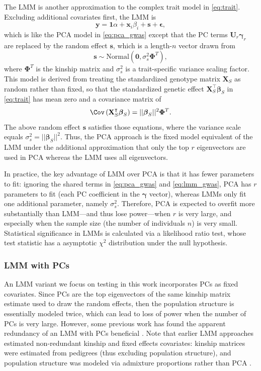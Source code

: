 \documentclass[11pt]{article}
\begin{document}
The LMM is another approximation to the complex trait model in \cref{eq:trait}.
Excluding additional covariates first, the LMM is
\begin{equation}
  \label{eq:lmm_gwas}
  \mathbf{y}
  =
  \mathbf{1} \alpha + \mathbf{x}_i \beta_i + \mathbf{s} + \boldsymbol{\epsilon}
  ,
\end{equation}
which is like the PCA model in \cref{eq:pca_gwas} except that the PC terms $\mathbf{U}_r \boldsymbol{\gamma}_r$ are replaced by the random effect $\mathbf{s}$, which is a length-$n$ vector drawn from \citep{sul_population_2018}
$$
\mathbf{s} \sim \text{Normal} \left( \mathbf{0}, \sigma^2_s \mathbf{\Phi}^T \right),
$$
where $\mathbf{\Phi}^T$ is the kinship matrix and $\sigma^2_s$ is a trait-specific variance scaling factor.
This model is derived from treating the standardized genotype matrix $\mathbf{X}_S$ as random rather than fixed, so that the standardized genetic effect
$\mathbf{X}_S^\intercal \boldsymbol{\beta}_S$
in \cref{eq:trait} has mean zero and a covariance matrix of
$$
\Cov \left( \mathbf{X}_S^\intercal \boldsymbol{\beta}_S \right)
=
|| \boldsymbol{\beta}_S ||^2 \mathbf{\Phi}^T
.
$$
The above random effect $\mathbf{s}$ satisfies those equations, where the variance scale equals $\sigma^2_s = || \boldsymbol{\beta}_S ||^2$.
Thus, the PCA approach is the fixed model equivalent of the LMM under the additional approximation that only the top $r$ eigenvectors are used in PCA whereas the LMM uses all eigenvectors.

In practice, the key advantage of LMM over PCA is that it has fewer parameters to fit: ignoring the shared terms in \cref{eq:pca_gwas} and \cref{eq:lmm_gwas}, PCA has $r$ parameters to fit (each PC coefficient in the $\boldsymbol{\gamma}$ vector), whereas LMMs only fit one additional parameter, namely $\sigma^2_s$.
Therefore, PCA is expected to overfit more substantially than LMM---and thus lose power---when $r$ is very large, and especially when the sample size (the number of individuals $n$) is very small.
Statistical significance in LMMs is calculated via a likelihood ratio test, whose test statistic has a asymptotic $\chi^2$ distribution under the null hypothesis.

\subsubsection{LMM with PCs}

An LMM variant we focus on testing in this work incorporates PCs as fixed covariates.
Since PCs are the top eigenvectors of the same kinship matrix estimate used to draw the random effects, then the population structure is essentially modeled twice, which can lead to loss of power when the number of PCs is very large.
However, some previous work has found the apparent redundancy of an LMM with PCs beneficial \citep{zhao_arabidopsis_2007, price_new_2010}.
Note that earlier LMM approaches estimated non-redundant kinship and fixed effects covariates: kinship matrices were estimated from pedigrees (thus excluding population structure), and population structure was modeled via admixture proportions rather than PCA \citep{yu_unified_2006, zhao_arabidopsis_2007}.
\end{document}
